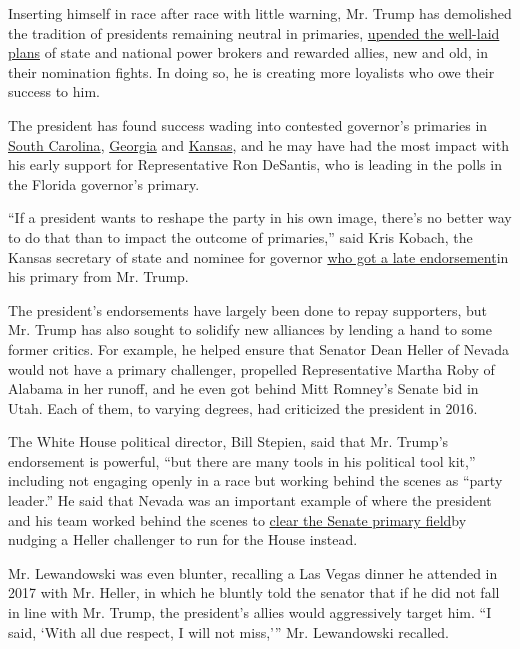 Inserting himself in race after race with little warning, Mr. Trump has
demolished the tradition of presidents remaining neutral in primaries,
\href{https://www.nytimes3xbfgragh.onion/2018/07/20/us/politics/trump-endorsement-kemp.html}{upended
the well-laid plans} of state and national power brokers and rewarded
allies, new and old, in their nomination fights. In doing so, he is
creating more loyalists who owe their success to him.

The president has found success wading into contested governor's
primaries in
\href{https://www.nytimes3xbfgragh.onion/2018/06/26/us/politics/primaries-henry-mcmaster-trump.html}{South
Carolina},
\href{https://www.nytimes3xbfgragh.onion/2018/07/18/us/politics/trump-brian-kemp-georgia.html}{Georgia}
and
\href{https://www.nytimes3xbfgragh.onion/2018/08/14/us/politics/kansas-kobach-colyer.html}{Kansas},
and he may have had the most impact with his early support for
Representative Ron DeSantis, who is leading in the polls in the Florida
governor's primary.

``If a president wants to reshape the party in his own image, there's no
better way to do that than to impact the outcome of primaries,'' said
Kris Kobach, the Kansas secretary of state and nominee for governor
\href{https://www.nytimes3xbfgragh.onion/2018/08/06/us/politics/kris-kobach-trump-kansas.html}{who
got a late endorsement}in his primary from Mr. Trump.

The president's endorsements have largely been done to repay supporters,
but Mr. Trump has also sought to solidify new alliances by lending a
hand to some former critics. For example, he helped ensure that Senator
Dean Heller of Nevada would not have a primary challenger, propelled
Representative Martha Roby of Alabama in her runoff, and he even got
behind Mitt Romney's Senate bid in Utah. Each of them, to varying
degrees, had criticized the president in 2016.

The White House political director, Bill Stepien, said that Mr. Trump's
endorsement is powerful, ``but there are many tools in his political
tool kit,'' including not engaging openly in a race but working behind
the scenes as ``party leader.'' He said that Nevada was an important
example of where the president and his team worked behind the scenes to
\href{https://www.nytimes3xbfgragh.onion/2018/03/16/us/politics/bannon-republican-senate-primary-challengers.html}{clear
the Senate primary field}by nudging a Heller challenger to run for the
House instead.

Mr. Lewandowski was even blunter, recalling a Las Vegas dinner he
attended in 2017 with Mr. Heller, in which he bluntly told the senator
that if he did not fall in line with Mr. Trump, the president's allies
would aggressively target him. ``I said, `With all due respect, I will
not miss,''' Mr. Lewandowski recalled.

